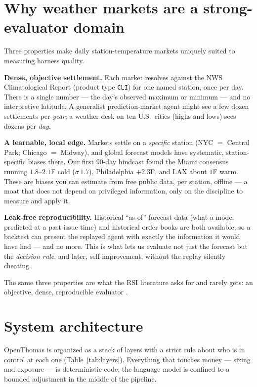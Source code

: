 \documentclass[10pt,twocolumn]{article}
\begin{document}
\section{Why weather markets are a strong-evaluator domain}
\label{sec:weather}

Three properties make daily station-temperature markets uniquely suited to
measuring harness quality.

\textbf{Dense, objective settlement.} Each market resolves against the NWS
Climatological Report (product type \texttt{CLI}) for one named station, once per
day. There is a single number --- the day's observed maximum or minimum --- and no
interpretive latitude. A generalist prediction-market agent might see a few
dozen settlements per \emph{year}; a weather desk on ten U.S.\ cities
(highs and lows) sees dozens per \emph{day}.

\textbf{A learnable, local edge.} Markets settle on a \emph{specific} station
(NYC $=$ Central Park; Chicago $=$ Midway), and global forecast models have
systematic, station-specific biases there. Our first 90-day hindcast found the
Miami consensus running $1.8$--$2.1$\textdegree F cold ($\sigma\,1.7$),
Philadelphia $+2.3$\textdegree F, and LAX about $1$\textdegree F warm. These are
biases you can estimate from free public data, per station, offline --- a moat
that does not depend on privileged information, only on the discipline to
measure and apply it.

\textbf{Leak-free reproducibility.} Historical ``as-of'' forecast data (what a
model predicted at a past issue time) and historical order books are both
available, so a backtest can present the replayed agent with exactly the
information it would have had --- and no more. This is what lets us evaluate not
just the forecast but the \emph{decision rule}, and later, self-improvement,
without the replay silently cheating.

The same three properties are what the RSI literature asks for and rarely gets:
an objective, dense, reproducible evaluator \cite{harness}.

\section{System architecture}
\label{sec:arch}

OpenThomas is organized as a stack of layers with a strict rule about who is in
control at each one (Table~\ref{tab:layers}). Everything that touches money ---
sizing and exposure --- is deterministic code; the language model is confined to
a bounded adjustment in the middle of the pipeline.
\end{document}
